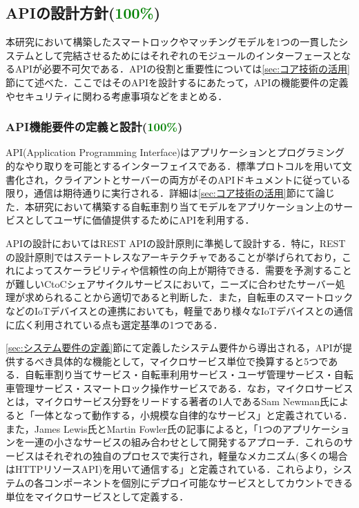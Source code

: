   \subsection{APIの設計方針(\textcolor{green}{100\%})}
    \label{sec:APIの設計方針}
      \par 本研究において構築したスマートロックやマッチングモデルを1つの一貫したシステムとして完結させるためにはそれぞれのモジュールのインターフェースとなるAPIが必要不可欠である．APIの役割と重要性については\ref{sec:コア技術の活用}節にて述べた．ここではそのAPIを設計するにあたって，APIの機能要件の定義やセキュリティに関わる考慮事項などをまとめる．
      
      \subsubsection{API機能要件の定義と設計(\textcolor{green}{100\%})}
        \label{sec:API機能要件の定義と設計}
          \par API(Application Programming Interface)はアプリケーションとプログラミング的なやり取りを可能とするインターフェイスである．標準プロトコルを用いて文書化され，クライアントとサーバーの両方がそのAPIドキュメントに従っている限り，通信は期待通りに実行される．詳細は\ref{sec:コア技術の活用}節にて論じた．本研究において構築する自転車割り当てモデルをアプリケーション上のサービスとしてユーザに価値提供するためにAPIを利用する．
          \par APIの設計においてはREST APIの設計原則に準拠して設計する．特に，RESTの設計原則ではステートレスなアーキテクチャであることが挙げられており，これによってスケーラビリティや信頼性の向上が期待できる．需要を予測することが難しいCtoCシェアサイクルサービスにおいて，ニーズに合わせたサーバー処理が求められることから適切であると判断した．また，自転車のスマートロックなどのIoTデバイスとの連携においても，軽量であり様々なIoTデバイスとの通信に広く利用されている点も選定基準の1つである．
          \par \ref{sec:システム要件の定義}節にて定義したシステム要件から導出される，APIが提供するべき具体的な機能として，マイクロサービス単位で換算すると5つである．自転車割り当てサービス・自転車利用サービス・ユーザ管理サービス・自転車管理サービス・スマートロック操作サービスである．なお，マイクロサービスとは，マイクロサービス分野をリードする著者の1人であるSam Newman氏によると「一体となって動作する，小規模な自律的なサービス」と定義されている．また，James Lewis氏とMartin Fowler氏の記事によると，「1つのアプリケーションを一連の小さなサービスの組み合わせとして開発するアプローチ．これらのサービスはそれぞれの独自のプロセスで実行され，軽量なメカニズム(多くの場合はHTTPリソースAPI)を用いて通信する」と定義されている．これらより，システムの各コンポーネントを個別にデプロイ可能なサービスとしてカウントできる単位をマイクロサービスとして定義する．
